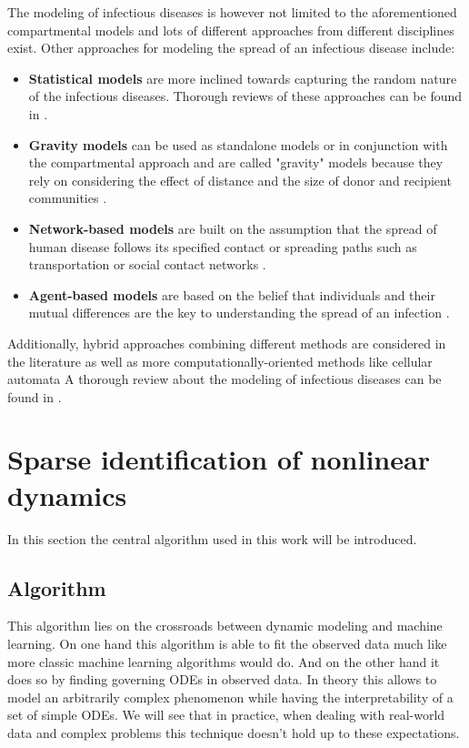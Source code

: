 \documentclass[12pt, letterpaper]{article}
\begin{document}
The modeling of infectious diseases is however not limited to the aforementioned compartmental models and lots of different approaches from different disciplines exist. 
Other approaches for modeling the spread of an infectious disease include:

\begin{itemize}

\item \textbf{Statistical models} are more inclined towards capturing the random nature of the infectious diseases. 
Thorough reviews of these approaches can be found in \cite{}.

\item \textbf{Gravity models} can be used as standalone models or in conjunction with the compartmental approach and are called "gravity" models because they rely on considering the effect of distance and the size of donor and recipient communities \cite{}. 

\item \textbf{Network-based models} are built on the assumption that the spread of human disease follows its specified contact or spreading paths such as transportation or social contact networks \cite{}.

\item \textbf{Agent-based models} are based on the belief that individuals and their mutual differences are the key to understanding the spread of an infection \cite{}.
\end{itemize}

Additionally, hybrid approaches combining different methods are considered in the literature \cite{} as well as more computationally-oriented methods like cellular automata \cite{}
A thorough review about the modeling of infectious diseases can be found in \cite{}.

\section{Sparse identification of nonlinear dynamics}\label{sec:sindy}

In this section the central algorithm used in this work will be introduced. 

\subsection{Algorithm}

This algorithm lies on the crossroads between dynamic modeling and machine learning. 
On one hand this algorithm is able to fit the observed data much like more classic machine learning algorithms would do. 
And on the other hand it does so by finding governing ODEs in observed data. 
In theory this allows to model an arbitrarily complex phenomenon while having the interpretability of a set of simple ODEs. 
We will see that in practice, when dealing with real-world data and complex problems this technique doesn't hold up to these expectations.
\end{document}
